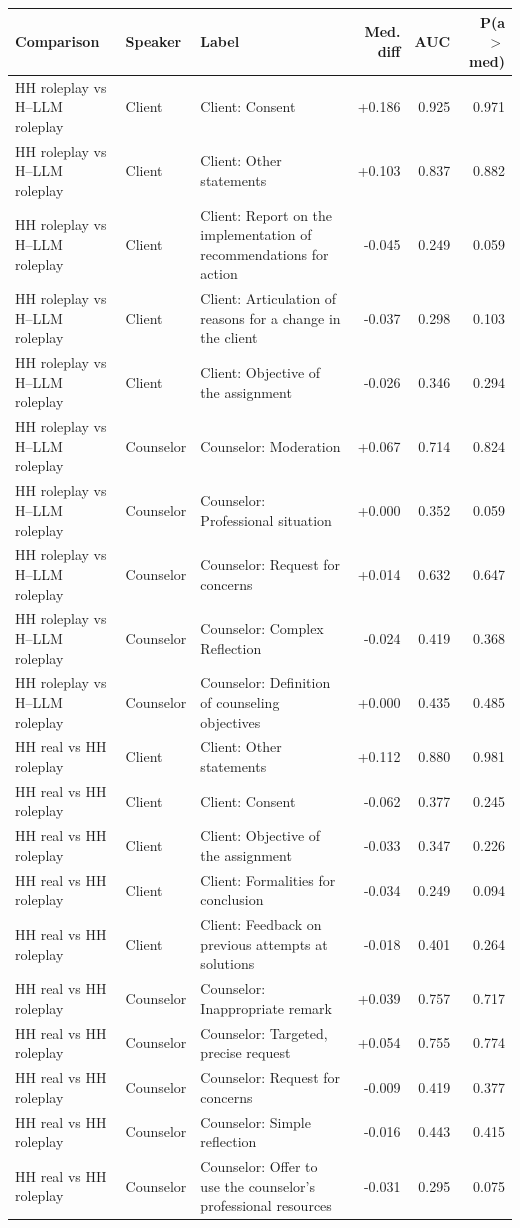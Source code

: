 \begin{tabular}{l l l r r r}
\toprule
Comparison & Speaker & Label & Med. diff & AUC & P(a$>$med) \\
\midrule
HH roleplay vs H--LLM roleplay & Client & Client: Consent & +0.186 & 0.925 & 0.971 \\
HH roleplay vs H--LLM roleplay & Client & Client: Other statements & +0.103 & 0.837 & 0.882 \\
HH roleplay vs H--LLM roleplay & Client & Client: Report on the implementation of recommendations for action & -0.045 & 0.249 & 0.059 \\
HH roleplay vs H--LLM roleplay & Client & Client: Articulation of reasons for a change in the client & -0.037 & 0.298 & 0.103 \\
HH roleplay vs H--LLM roleplay & Client & Client: Objective of the assignment & -0.026 & 0.346 & 0.294 \\
HH roleplay vs H--LLM roleplay & Counselor & Counselor: Moderation & +0.067 & 0.714 & 0.824 \\
HH roleplay vs H--LLM roleplay & Counselor & Counselor: Professional situation & +0.000 & 0.352 & 0.059 \\
HH roleplay vs H--LLM roleplay & Counselor & Counselor: Request for concerns & +0.014 & 0.632 & 0.647 \\
HH roleplay vs H--LLM roleplay & Counselor & Counselor: Complex Reflection & -0.024 & 0.419 & 0.368 \\
HH roleplay vs H--LLM roleplay & Counselor & Counselor: Definition of counseling objectives & +0.000 & 0.435 & 0.485 \\
HH real vs HH roleplay & Client & Client: Other statements & +0.112 & 0.880 & 0.981 \\
HH real vs HH roleplay & Client & Client: Consent & -0.062 & 0.377 & 0.245 \\
HH real vs HH roleplay & Client & Client: Objective of the assignment & -0.033 & 0.347 & 0.226 \\
HH real vs HH roleplay & Client & Client: Formalities for conclusion & -0.034 & 0.249 & 0.094 \\
HH real vs HH roleplay & Client & Client: Feedback on previous attempts at solutions & -0.018 & 0.401 & 0.264 \\
HH real vs HH roleplay & Counselor & Counselor: Inappropriate remark & +0.039 & 0.757 & 0.717 \\
HH real vs HH roleplay & Counselor & Counselor: Targeted, precise request & +0.054 & 0.755 & 0.774 \\
HH real vs HH roleplay & Counselor & Counselor: Request for concerns & -0.009 & 0.419 & 0.377 \\
HH real vs HH roleplay & Counselor & Counselor: Simple reflection & -0.016 & 0.443 & 0.415 \\
HH real vs HH roleplay & Counselor & Counselor: Offer to use the counselor’s professional resources & -0.031 & 0.295 & 0.075 \\
\bottomrule
\end{tabular}
